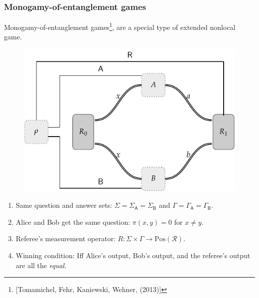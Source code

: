 \documentclass{beamer}
\def\R{\mathcal{R}}
\def \GammaA{\Gamma_{\reg{A}}}
\def \GammaB{\Gamma_{\reg{B}}}
\def \SigmaA{\Sigma_{\reg{A}}}
\def \SigmaB{\Sigma_{\reg{B}}}
\newcommand{\setft}[1]{\mathrm{#1}}
\newcommand{\Pos}{\setft{Pos}}
\newcommand{\reg}[1]{\mathsf{#1}}
\begin{document}
\begin{frame}
	\frametitle{Monogamy-of-entanglement games}
	Monogamy-of-entanglement games\footnote{[Tomamichel, Fehr, Kaniewski, Wehner, (2013)]}, are a special type of extended nonlocal game. 
\begin{figure}[!htpb] \label{fig:monogamy-of-entanglement game}
	\begin{center}
		\includegraphics[scale=0.7]{figures/moe_2.pdf}
	\end{center}
\end{figure}
	\begin{enumerate}
		\item Same question and answer sets: $\Sigma = \SigmaA = \SigmaB$ and $\Gamma = \GammaA = \GammaB$. 
		\item Alice and Bob get the same question: $\pi(x,y) = 0$ for $x \not= y$. 
		\item Referee's measurement operator: $R : \Sigma \times \Gamma \rightarrow \Pos(\R)$. 
		\item Winning condition: Iff Alice's output, Bob's output, and the referee's output are all the \emph{equal}. 
	\end{enumerate}
\end{frame}
\end{document}
